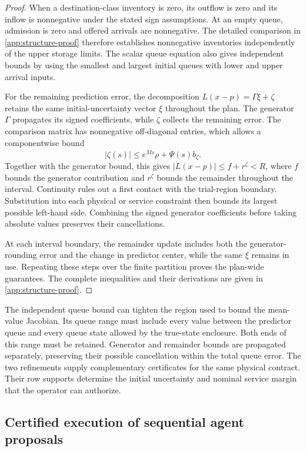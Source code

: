 \documentclass[preprint,12pt]{elsarticle}
\newcommand{\appref}[1]{\ref{#1}}
\begin{document}
\begin{proof}
When a destination-class inventory is zero, its outflow is zero and its
inflow is nonnegative under the stated sign assumptions. At an empty
queue, admission is zero and offered arrivals are nonnegative. The
detailed comparison in \appref{app:structure-proof} therefore establishes
nonnegative inventories independently of the upper storage limits.
The scalar queue equation also gives independent bounds by using the
smallest and largest initial queues with lower and upper arrival inputs.

For the remaining prediction error, the decomposition
$L(x-p)=\Gamma\xi+\zeta$ retains the same initial-uncertainty vector
$\xi$ throughout the plan. The generator $\Gamma$ propagates its signed
coefficients, while $\zeta$ collects the remaining error. The comparison
matrix has nonnegative off-diagonal entries, which allows a componentwise
bound
\[
 |\zeta(s)|\le e^{\overline M s}\rho+\Psi(s)b_\zeta.
\]
Together with the generator bound, this gives
$|L(x-p)|\le f+r^\zeta<R$, where $f$ bounds the generator contribution
and $r^\zeta$ bounds the remainder throughout the interval.
Continuity rules out a first contact with the
trial-region boundary. Substitution into each physical or service
constraint then bounds its largest possible left-hand side. Combining
the signed generator coefficients before taking absolute values preserves
their cancellations.

At each interval boundary, the remainder update includes both the
generator-rounding error and the change in predictor center, while the
same $\xi$ remains in use. Repeating these steps over the finite
partition proves the plan-wide guarantees. The complete inequalities
and their derivations are given in \appref{app:structure-proof}.
\end{proof}

The independent queue bound can tighten the region used to bound the
mean-value Jacobian. Its queue range must include every value between the
predictor queue and every queue state allowed by the true-state enclosure.
Both ends of this range must be retained. Generator and remainder bounds
are propagated separately, preserving their possible cancellation within the
total queue error. The two refinements supply complementary certificates
for the same physical contract. Their row supports determine the initial
uncertainty and nominal service margin that the operator can authorize.

\subsection{Certified execution of sequential agent proposals}
\label{sec:new-execution}
\end{document}
